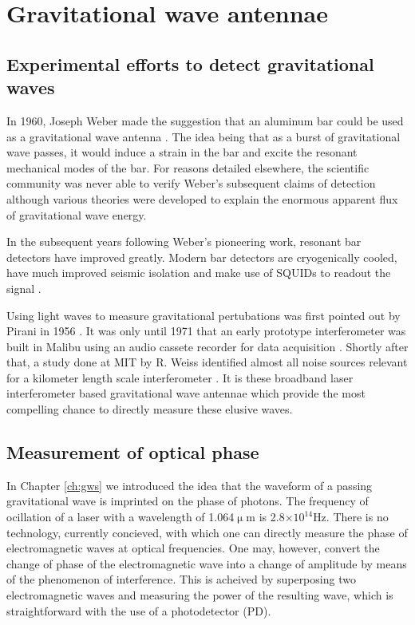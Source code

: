 \chapter{Gravitational wave antennae}
\label{ch:ifo}
\section{Experimental efforts to detect gravitational waves}
In 1960, Joseph Weber made the suggestion that an aluminum bar could be used as a gravitational wave antenna \cite{bar1}. %
The idea being that as a burst of gravitational wave passes, it would induce a strain in the bar and excite the resonant mechanical modes of the bar. %
For reasons detailed elsewhere\cite{bar2,bar3}, the scientific community was never able to verify Weber's subsequent claims of detection\cite{bar4} although various theories\cite{bar5,bar6} were developed to explain the enormous apparent flux of gravitational wave energy.

In the subsequent years following Weber’s pioneering work, resonant bar detectors have improved greatly. %
Modern bar detectors are cryogenically cooled, have much improved seismic isolation and make use of SQUIDs to readout the signal \cite{bar7}.

Using light waves to measure gravitational pertubations was first pointed out by Pirani in 1956 \cite{ifo1}. %
It was only until 1971 that an early prototype interferometer was built in Malibu using an audio cassete recorder for data acquisition \cite{ifo2}. %
Shortly after that, a study done at MIT by R. %
Weiss identified almost all noise sources relevant for a kilometer length scale interferometer \cite{ifo3}. %
It is these broadband laser interferometer based gravitational wave antennae which provide the most compelling chance to directly measure these elusive waves.


\section{Measurement of optical phase}
In Chapter \ref{ch:gws} we introduced the idea that the waveform of a passing gravitational wave is imprinted on the phase of photons. %
The frequency of ocillation of a laser with a wavelength of 1.064$\upmu$m is 2.8$\times 10^{14}$Hz. %
There is no technology, currently concieved, with which one can directly measure the phase of electromagnetic waves at optical frequencies. %
One may, however, convert the change of phase of the electromagnetic wave into a change of amplitude by means of the phenomenon of interference. %
This is acheived by superposing two electromagnetic waves and measuring the power of the resulting wave, which is straightforward with the use of a photodetector (PD). %



